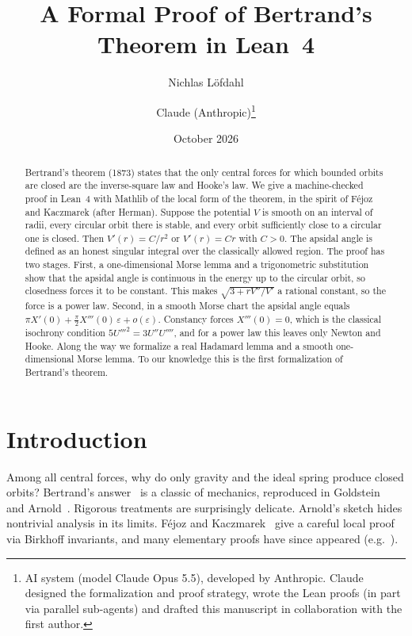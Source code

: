 \documentclass[11pt]{article}
\title{A Formal Proof of Bertrand's Theorem in Lean~4}
\author{Nichlas Löfdahl \and Claude (Anthropic)\thanks{AI system (model Claude Opus 5.5), developed by Anthropic.
Claude designed the formalization and proof strategy, wrote the Lean proofs (in part via parallel sub-agents) and drafted this
manuscript in collaboration with the first author.}}
\date{October 2026}
\theoremstyle{remark}
\begin{document}
\sloppy
\maketitle

\begin{abstract}
Bertrand's theorem (1873) states that the only central forces for which bounded orbits are closed
are the inverse-square law and Hooke's law. We give a machine-checked proof in Lean~4 with
Mathlib of the local form of the theorem, in the spirit of Féjoz and Kaczmarek (after Herman).
Suppose the potential $V$ is smooth on an interval of radii, every circular orbit there is
stable, and every orbit sufficiently close to a circular one is closed. Then $V'(r)=C/r^2$ or
$V'(r)=Cr$ with $C>0$. The apsidal angle is defined as an honest singular integral over the
classically allowed region. The proof has two stages. First, a one-dimensional Morse lemma and a
trigonometric substitution show that the apsidal angle is continuous in the energy up to the
circular orbit, so closedness forces it to be constant. This makes $\sqrt{3+rV''/V'}$ a rational
constant, so the force is a power law. Second, in a smooth Morse chart the apsidal angle equals
$\pi X'(0)+\tfrac{\pi}{2}X'''(0)\,\varepsilon+o(\varepsilon)$. Constancy forces $X'''(0)=0$,
which is the classical isochrony condition $5U'''^2=3U''U''''$, and for a power law this leaves
only Newton and Hooke. Along the way we formalize a real Hadamard lemma and a smooth
one-dimensional Morse lemma. To our knowledge this is the first formalization of Bertrand's
theorem.
\end{abstract}

\section{Introduction}

Among all central forces, why do only gravity and the ideal spring produce closed orbits? Bertrand's
answer~\cite{bertrand1873} is a classic of mechanics, reproduced in Goldstein~\cite{goldstein} and
Arnold~\cite{arnold}. Rigorous treatments are surprisingly delicate. Arnold's sketch hides
nontrivial analysis in its limits. Féjoz and Kaczmarek~\cite{fejoz2004} give a careful local proof
via Birkhoff invariants, and many elementary proofs have since appeared (e.g.~\cite{chin2015}).
\end{document}
